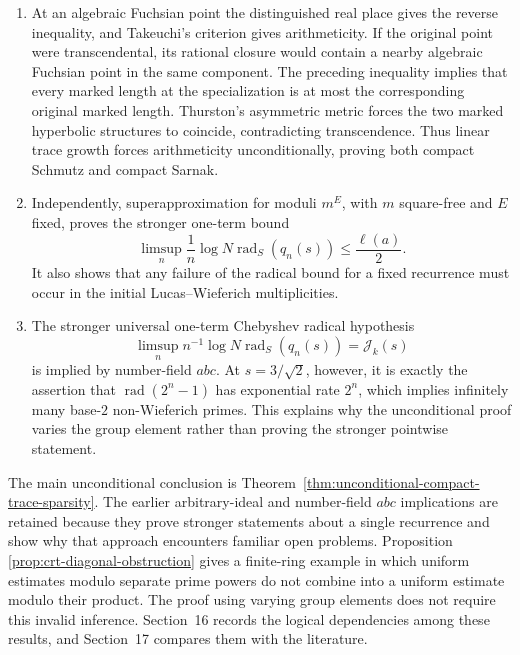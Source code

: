 \documentclass[11pt,reqno]{amsart}
\theoremstyle{definition}
\theoremstyle{remark}
\newcommand{\Tr}{\operatorname{tr}}
\begin{document}
\begin{enumerate}[label=\textup{(\roman*)}]
\((q_{n-1}(s)q_n(s))\) into a comparison between global recurrence height
and geometric translation length.  Fixing the recurrence index, Roth's
theorem gives a lower bound for almost the entire reduced divisor of two
consecutive terms.  A sieve over varying group elements, using expansion
only modulo \(p^2\), chooses \(a_m=b^mh_m\) for which this divisor has
bounded prime exponents.  Superapproximation for moduli whose prime
exponents are uniformly bounded, together with the uniform estimate
\[
 \#\{g:d_x(o,go)\le Cm,
       \Tr_y g=\xi,\ \Tr_y(a_mg)=\zeta\}\le\exp(o_C(m)),
\]
then gives
\[
 \mathcal J_{k_y}(\Tr_yb)\le\frac{\ell_x(b)}2
\]
for every algebraic faithful cocompact Fuchsian character \(y\) in the
rational closure of \(x\).
\item At an algebraic Fuchsian point the distinguished real place gives
the reverse inequality, and Takeuchi's criterion \cite{Takeuchi} gives
arithmeticity.
If the original point were transcendental, its rational closure would
contain a nearby algebraic Fuchsian point in the same component.  The
preceding inequality implies that every marked length at the specialization
is at most the corresponding original marked length.  Thurston's asymmetric
metric \cite{ThurstonStretch} forces the two marked hyperbolic structures to
coincide, contradicting transcendence.  Thus linear trace growth forces arithmeticity
unconditionally, proving both compact Schmutz and compact Sarnak.
\item Independently, superapproximation for moduli \(m^E\), with \(m\)
square-free and \(E\) fixed, proves the stronger
one-term bound
\[
 \limsup_n\frac1n
 \log N\operatorname{rad}_S(q_n(s))\le\frac{\ell(a)}2.
\]
It also shows that any failure of the radical bound for a fixed recurrence
must occur in the initial Lucas--Wieferich multiplicities.
\item The stronger universal one-term Chebyshev radical hypothesis
\[
 \limsup_n n^{-1}\log N\operatorname{rad}_S(q_n(s))
 =\mathcal J_k(s)
\]
is implied by number-field \(abc\).  At \(s=3/\sqrt2\), however, it is
exactly the assertion that
\(\operatorname{rad}(2^n-1)\) has exponential rate \(2^n\), which implies
infinitely many base-\(2\) non-Wieferich primes.  This explains why the
unconditional proof varies the group element rather than proving the stronger
pointwise statement.
\end{enumerate}

The main unconditional conclusion is
Theorem~\ref{thm:unconditional-compact-trace-sparsity}.  The earlier
arbitrary-ideal and number-field \(abc\) implications are retained because
they prove stronger statements about a single recurrence and show why that
approach encounters familiar open problems.  Proposition
\ref{prop:crt-diagonal-obstruction} gives a finite-ring example in which
uniform estimates modulo separate prime powers do not combine into a
uniform estimate modulo their product.  The proof using varying group
elements does not require this invalid inference.  Section~16 records the
logical dependencies among these results, and Section~17 compares them with
the literature.
\end{document}
